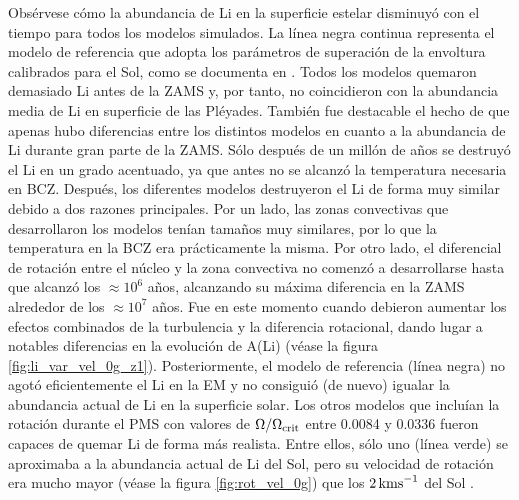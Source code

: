 Obsérvese cómo la abundancia de Li en la superficie estelar disminuyó con el tiempo para todos los modelos simulados. La línea negra continua representa el modelo de referencia que adopta los parámetros de superación de la envoltura calibrados para el Sol, como se documenta en \cite{Choi2016}. Todos los modelos quemaron demasiado Li antes de la ZAMS y, por tanto, no coincidieron con la abundancia media de Li en superficie de las Pléyades. También fue destacable el hecho de que apenas hubo diferencias entre los distintos modelos en cuanto a la abundancia de Li durante gran parte de la ZAMS. Sólo después de un millón de años se destruyó el Li en un grado acentuado, ya que antes no se alcanzó la temperatura necesaria en BCZ. Después, los diferentes modelos destruyeron el Li de forma muy similar debido a dos razones principales. Por un lado, las zonas convectivas que desarrollaron los modelos tenían tamaños muy similares, por lo que la temperatura en la BCZ era prácticamente la misma. Por otro lado, el diferencial de rotación entre el núcleo y la zona convectiva no comenzó a desarrollarse hasta que alcanzó los $ \approx 10^6$ años, alcanzando su máxima diferencia en la ZAMS alrededor de los $ \approx 10^7$ años. Fue en este momento cuando debieron aumentar los efectos combinados de la turbulencia y la diferencia rotacional, dando lugar a notables diferencias en la evolución de A(Li) (véase la figura \ref{fig:li_var_vel_0g_z1}). Posteriormente, el modelo de referencia (línea negra) no agotó eficientemente el Li en la EM y no consiguió (de nuevo) igualar la abundancia actual de Li en la superficie solar. Los otros modelos que incluían la rotación durante el PMS con valores de $\Omega / \Omega_{\mathrm{crit}}$ entre 0.0084 y 0.0336 fueron capaces de quemar Li de forma más realista. Entre ellos, sólo uno (línea verde) se aproximaba a la abundancia actual de Li del Sol, pero su velocidad de rotación era mucho mayor (véase la figura \ref{fig:rot_vel_0g}) que los $2\,\mathrm{kms}^{-1}$ del Sol \cite{Gill2012}. \par

